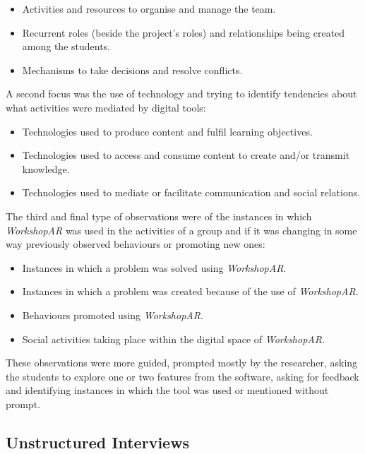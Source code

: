 \begin{itemize}
    \item Activities and resources to organise and manage the team.
    \item Recurrent roles (beside the project's roles) and relationships being created among the students.
    \item Mechanisms to take decisions and resolve conflicts.
\end{itemize}

A second focus was the use of technology and trying to identify tendencies about what activities were mediated by digital tools:

\begin{itemize}
    \item Technologies used to produce content and fulfil learning objectives.
    \item Technologies used to access and consume content to create and/or transmit knowledge.
    \item Technologies used to mediate or facilitate communication and social relations.
\end{itemize}

The third and final type of observations were of the instances in which \emph{WorkshopAR} was used in the activities of a group and if it was changing in some way previously
observed behaviours or promoting new ones:

\begin{itemize}
    \item Instances in which a problem was solved using \emph{WorkshopAR}.
    \item Instances in which a problem was created because of the use of \emph{WorkshopAR}.
    \item Behaviours promoted using \emph{WorkshopAR}.
    \item Social activities taking place within the digital space of \emph{WorkshopAR}.
\end{itemize}

These observations were more guided, prompted mostly by the researcher, asking the students to explore one or two features from the software, asking for feedback and
identifying instances in which the tool was used or mentioned without prompt.

\subsection{Unstructured Interviews \label{sec:6-3-3}}

